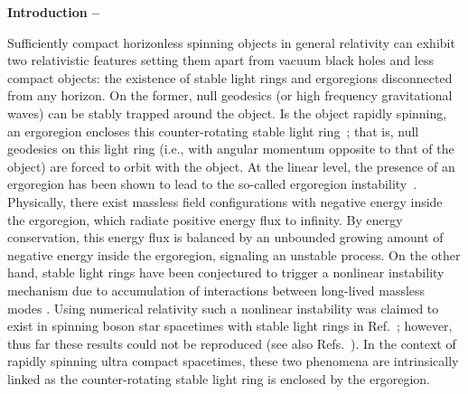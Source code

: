 \documentclass[aps,prl,notitlepage,superscriptaddress,twocolumn]{revtex4-1}
\newcommand{\red}[1]{{{#1}}}
\begin{document}
\textbf{Introduction --} \red{Sufficiently compact horizonless spinning objects in general relativity can exhibit two relativistic features setting them apart from vacuum black holes and less compact objects: the existence of stable light rings and ergoregions disconnected from any horizon. On the former, null geodesics (or high frequency gravitational waves) can be stably trapped around the object. Is the object rapidly spinning, an ergoregion encloses this counter-rotating stable light ring~\cite{Cardoso:2014sna}; that is, null geodesics on this light ring (i.e., with angular momentum opposite to that of the object) are forced to orbit with the object. At the linear level, the presence of an ergoregion has been shown to lead to the so-called ergoregion instability~\cite{Friedman:1978,Vilenkin:1978uc,Moschidis:2016zjy}. Physically, there exist massless field configurations with negative energy inside the ergoregion, which radiate positive energy flux to infinity. By energy conservation, this energy flux is balanced by an unbounded growing amount of negative energy inside the ergoregion, signaling an unstable process. On the other hand, stable light rings have been conjectured to trigger a nonlinear instability mechanism due to accumulation of interactions between long-lived massless modes \cite{Keir:2014oka,Cardoso:2014sna}. Using numerical relativity such a nonlinear instability was claimed to exist in spinning boson star spacetimes with stable light rings in Ref.~\cite{Cunha:2022gde}; however, thus far these results could not be reproduced \cite{Evstafyeva:2025mvx,Siemonsen:2025wib} (see also Refs.~\cite{Marks:2025jpt,Siemonsen:2024snb}). In the context of rapidly spinning ultra compact spacetimes, these two phenomena are intrinsically linked as the counter-rotating stable light ring is enclosed by the ergoregion.

}
\end{document}
